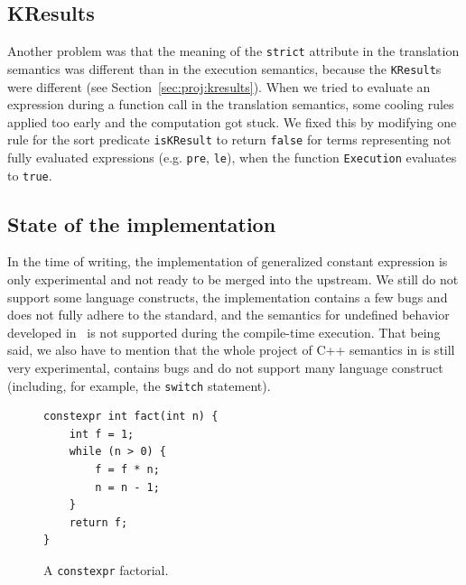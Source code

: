 \documentclass[nolot,nolof,nocover,printed]{fithesis3}
\begin{document}
\subsection{KResults}

Another problem was that the meaning of the \texttt{strict} attribute in the translation semantics was different than in the execution semantics, because the \texttt{KResult}s were different (see Section~\ref{sec:proj:kresults}). When we tried to evaluate an expression during a function call in the translation semantics, some cooling rules applied too early and the computation got stuck. We fixed this by modifying one rule for the sort predicate \texttt{isKResult} to return \texttt{false} for terms representing not fully evaluated expressions (e.g. \texttt{pre}, \texttt{le}), when the function \texttt{Execution} evaluates to \texttt{true}.






\subsection{State of the implementation}

In the time of writing, the implementation of generalized constant expression is only experimental and not ready to be merged into the upstream. We still do not support some language constructs, the implementation contains a few bugs and does not fully adhere to the standard, and the semantics for undefined behavior developed in~\cite{hathhorn-ellison-rosu-2015-pldi} is not supported during the compile-time execution. That being said, we also have to mention that the whole project of C++ semantics in \K is still very experimental, contains bugs and do not support many language construct (including, for example, the \texttt{switch} statement).



\begin{figure}[ht]
\begin{lstlisting}
constexpr int fact(int n) {
	int f = 1;
	while (n > 0) {
		f = f * n;
		n = n - 1;
	}
	return f;
}
\end{lstlisting}
\caption{A \texttt{constexpr} factorial.}
\label{fig:constexprFactorial}
\end{figure}
\end{document}
